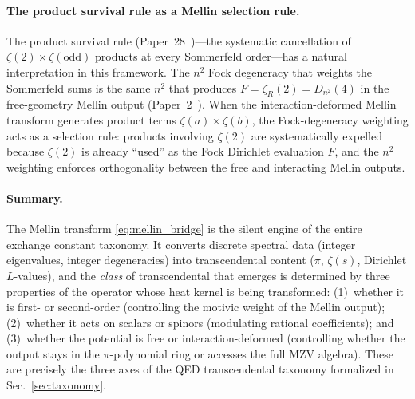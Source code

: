 \documentclass[aps,pra,twocolumn,superscriptaddress,longbibliography]{revtex4-2}
\begin{document}
\paragraph{The product survival rule as a Mellin selection rule.}
The product survival rule (Paper~28~\cite{loutey_paper28})---the systematic cancellation
of $\zeta(2) \times \zeta(\text{odd})$ products at every Sommerfeld
order---has a natural interpretation in this framework.  The
$n^2$ Fock degeneracy that weights the Sommerfeld sums is the same
$n^2$ that produces $F = \zeta_R(2) = D_{n^2}(4)$ in the free-geometry
Mellin output (Paper~2~\cite{loutey_paper2}).
When the interaction-deformed Mellin transform generates product
terms $\zeta(a) \times \zeta(b)$, the Fock-degeneracy weighting
acts as a selection rule: products involving $\zeta(2)$ are
systematically expelled because $\zeta(2)$ is already ``used'' as
the Fock Dirichlet evaluation $F$, and the $n^2$ weighting enforces
orthogonality between the free and interacting Mellin outputs.

\paragraph{Summary.}
The Mellin transform \eqref{eq:mellin_bridge} is the silent engine
of the entire exchange constant taxonomy.  It converts discrete
spectral data (integer eigenvalues, integer degeneracies) into
transcendental content ($\pi$, $\zeta(s)$, Dirichlet $L$-values),
and the \emph{class} of transcendental that emerges is determined by
three properties of the operator whose heat kernel is being
transformed: (1)~whether it is first- or second-order (controlling
the motivic weight of the Mellin output); (2)~whether it acts on
scalars or spinors (modulating rational coefficients); and
(3)~whether the potential is free or interaction-deformed (controlling
whether the output stays in the $\pi$-polynomial ring or accesses the
full MZV algebra).  These are precisely the three axes of the QED
transcendental taxonomy formalized in
Sec.~\ref{sec:taxonomy}.
\end{document}
